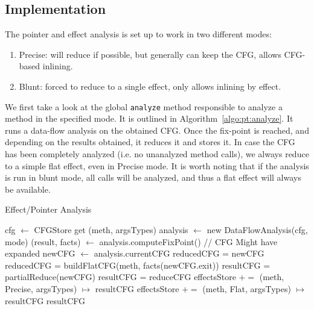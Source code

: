 \documentclass[a4paper]{article}
\begin{document}
\subsection{Implementation}
The pointer and effect analysis is set up to work in two different modes:
\begin{enumerate}
    \item Precise: will reduce if possible, but generally can keep the CFG,
    allows CFG-based inlining.
    \item Blunt: forced to reduce to a single effect, only allows inlining by
    effect.
\end{enumerate}

We first take a look at the global \verb=analyze= method responsible to analyze
a method in the specified mode. It is outlined in
Algorithm~\ref{algo:pt:analyze}. It runs a data-flow analysis on the obtained
CFG.  Once the fix-point is reached, and depending on the results obtained, it
reduces it and stores it. In case the CFG has been completely analyzed (i.e. no
unanalyzed method calls), we always reduce to a simple flat effect, even in
Precise mode. It is worth noting that if the analysis is run in blunt mode, all
calls will be analyzed, and thus a flat effect will always be available.

\begin{algorithm}
\caption{Effect/Pointer Analysis}\label{algo:pt:analyze}
\begin{algorithmic}[1]
    \State cfg $\gets$ CFGStore get (meth, argsTypes)
    \State analysis $\gets$ new DataFlowAnalysis(cfg, mode)
    \State (result, facts) $\gets$ analysis.computeFixPoint()
    \State // CFG Might have expanded
    \State newCFG $\gets$ analysis.currentCFG
        \State reducedCFG = newCFG
    \Else
        \State reducedCFG = buildFlatCFG(meth, facts(newCFG.exit))
    \EndIf
    \State
        \State resultCFG = partialReduce(newCFG)
    \Else
        \State resultCFG = reduceCFG
    \EndIf
    \State
        \State effectsStore $+=$ (meth, Precise, argsTypes) $\mapsto$ resultCFG
    \EndIf
    \State
        \State effectsStore $+=$ (meth, Flat, argsTypes) $\mapsto$ resultCFG
    \EndIf
    \State
    \State \Return resultCFG
\EndFunction
\end{algorithmic}
\end{algorithm}

\FloatBarrier
\end{document}
